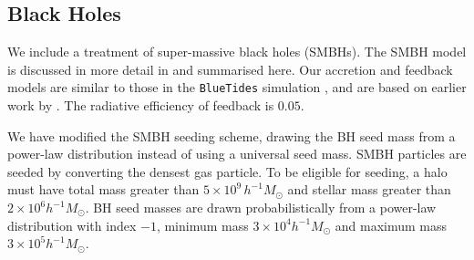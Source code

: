 \documentclass[fleqn,usenatbib]{mnras}
\def\bluetides{\texttt{BlueTides} }
\begin{document}
\subsection{Black Holes}
\label{sec:blackhole}

We include a treatment of super-massive black holes (SMBHs). The SMBH model is discussed in more detail in \cite{Ni:2021inprep} and summarised here. Our accretion and feedback models are similar to those in the \bluetides simulation \cite{Feng:2016}, and are based on earlier work by \cite{SDH2005,DSH2005}. The radiative efficiency of feedback is $0.05$.

We have modified the SMBH seeding scheme, drawing the BH seed mass from a power-law distribution instead of using a universal seed mass. SMBH particles are seeded by converting the densest gas particle. To be eligible for seeding, a halo must have total mass greater than $5\times10^{9}\,h^{-1}\unit{M_\odot}$ and stellar mass greater than $2 \times 10^6 h^{-1} M_\odot$.
BH seed masses are drawn probabilistically from a power-law distribution with index $-1$, minimum mass $3 \times 10^4 h^{-1} M_\odot$ and maximum mass $3 \times 10^5 h^{-1} M_\odot$.
\end{document}
